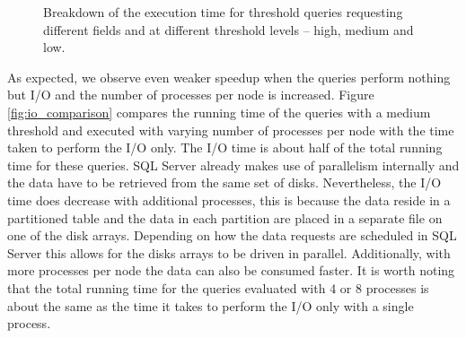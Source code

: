 \documentclass{sig-alternate}
\begin{document}
\begin{figure}
\caption{Breakdown of the execution time for threshold queries requesting different fields and at different threshold levels -- high, medium and low.}
\label{fig:breakdown}
\end{figure}

As expected, we observe even weaker speedup when the queries perform nothing but I/O and the number of processes per node is increased.
Figure \ref{fig:io_comparison} compares the running time of the queries with a medium threshold and executed with varying number of processes per 
node with
the time taken to perform the I/O only. The I/O time is about half of the total running time for these queries. SQL Server already makes use of parallelism
internally and the data have to be retrieved from the same set of disks. Nevertheless, the I/O time does decrease with additional processes, this is because
the data reside in a partitioned table and the data in each partition are placed in a separate file on one of the disk arrays. Depending on how the data
requests are scheduled in SQL Server this allows for the disks arrays to be driven in parallel. Additionally, with more processes per node the data can
also be consumed faster. It is worth noting that the total running time for the queries evaluated with 4 or 8
processes is about the same as the time it takes to perform the I/O only with a single process.
\end{document}
